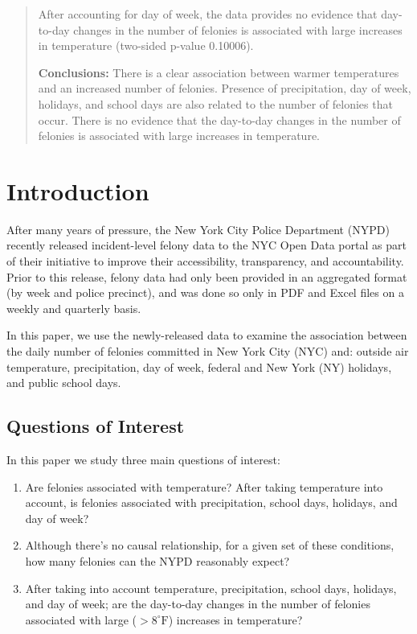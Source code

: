 \documentclass[11pt,notitlepage]{article}
\newcommand{\degf}{^\circ\text{F}}
\begin{document}
\begin{abstract}
After accounting for day of week, the data provides no evidence that day-to-day changes in the number of felonies is associated with large increases in temperature (two-sided p-value 0.10006).

\noindent \textbf{Conclusions:} There is a clear association between warmer temperatures and an increased number of felonies. Presence of precipitation, day of week, holidays, and school days are also related to the number of felonies that occur. There is no evidence that the day-to-day changes in the number of felonies is associated with large increases in temperature.




\end{abstract}


\pagebreak


\section{Introduction}



After many years of pressure, the New York City Police Department (NYPD) recently released incident-level felony data to the NYC Open Data portal as part of their initiative to improve their accessibility, transparency, and accountability. Prior to this release, felony data had only been provided in an aggregated format (by week and police precinct), and was done so only in PDF and Excel files on a weekly and quarterly basis.

In this paper, we use the newly-released data to examine the association between the daily number of felonies committed in New York City (NYC) and: outside air temperature, precipitation, day of week, federal and New York (NY) holidays, and public school days.

\subsection{Questions of Interest}

In this paper we study three main questions of interest:

\begin{enumerate}
\setlength\itemsep{-3pt}
\vspace*{-3mm}

\item Are felonies associated with temperature? After taking temperature into account, is felonies associated with precipitation, school days, holidays, and day of week?
\item Although there's no causal relationship, for a given set of these conditions, how many felonies can the NYPD reasonably expect?
\item After taking into account temperature, precipitation, school days, holidays, and day of week; are the day-to-day changes in the number of felonies associated with large ($>8 \degf$) increases in temperature?
\end{enumerate}
\end{document}
